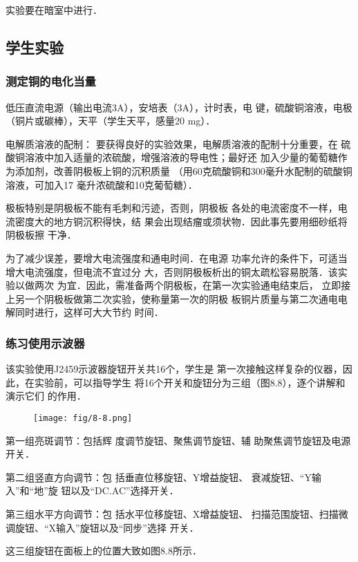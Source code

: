 实验要在暗室中进行．

\subsection{学生实验}
\subsubsection{测定铜的电化当量}
低压直流电源（输出电流3A），安培表（3A），计时表，电
键，硫酸铜溶液，电极（铜片或碳棒），天平（学生天平，感量20
mg）．

电解质溶液的配制：
要获得良好的实验效果，电解质溶液的配制十分重要，在
硫酸铜溶液中加入适量的浓硫酸，增强溶液的导电性；最好还
加入少量的葡萄糖作为添加剂，改善阴极板上铜的沉积质量
（用60克硫酸铜和300毫升水配制的硫酸铜溶液，可加入17
毫升浓硫酸和10克葡萄糖）．

极板特别是阴极板不能有毛刺和污迹，否则，阴极板
各处的电流密度不一样，电流密度大的地方铜沉积得快，结
果会出现结瘤或须状物．因此事先要用细砂纸将阴极板擦
干净．

为了减少误差，要增大电流强度和通电时间．在电源
功率允许的条件下，可适当增大电流强度，但电流不宜过分
大，否则阴极板析出的铜太疏松容易脱落．该实验以做两次
为宜．因此，需准备两个阴极板，在第一次实验通电结束后，
立即接上另一个阴极板做第二次实验，使称量第一次的阴极
板铜片质量与第二次通电电解同时进行，这样可大大节约
时间．

\subsubsection{练习使用示波器}

该实验使用J2459示波器旋钮开关共16个，学生是
第一次接触这样复杂的仪器，因此，在实验前，可以指导学生
将16个开关和旋钮分为三组（图8.8），逐个讲解和演示它们
的作用．

\begin{figure}[htp]
    \centering
\texttt{[image: fig/8-8.png]}
    \caption{}
\end{figure}

第一组亮斑调节：包括辉
度调节旋钮、聚焦调节旋钮、辅
助聚焦调节旋钮及电源开关．

第二组竖直方向调节：包
括垂直位移旋钮、Y增益旋钮、
衰减旋钮、“Y输入”和“地”旋
钮以及“DC.AC”选择开关．

第三组水平方向调节：包
括水平位移旋钮、X增益旋钮、
扫描范围旋钮、扫描微调旋钮、“X输入”旋钮以及“同步”选择
开关．

这三组旋钮在面板上的位置大致如图8.8所示．

